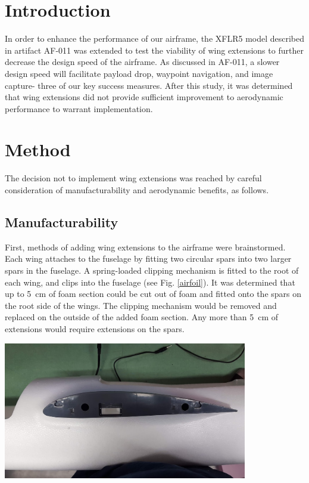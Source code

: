 \documentclass[]{auvsi_doc}
\begin{document}
\begin{AUVSITitlePage}
\begin{artifacttable}
\end{artifacttable}
\end{AUVSITitlePage}

\section{Introduction}
In order to enhance the performance of our airframe, the XFLR5 model described in artifact AF-011 was extended to test the viability of wing extensions to further decrease the design speed of the airframe. As discussed in AF-011, a slower design speed will facilitate payload drop, waypoint navigation, and image capture- three of our key success measures. After this study, it was determined that wing extensions did not provide sufficient improvement to aerodynamic performance to warrant implementation.

\section{Method}
The decision not to implement wing extensions was reached by careful consideration of manufacturability and aerodynamic benefits, as follows.

\subsection{Manufacturability}
First, methods of adding wing extensions to the airframe were brainstormed. Each wing attaches to the fuselage by fitting two circular spars into two larger spars in the fuselage. A spring-loaded clipping mechanism is fitted to the root of each wing, and clips into the fuselage (see Fig. \ref{airfoil}). It was determined that up to 5~cm of foam section could be cut out of foam and fitted onto the spars on the root side of the wings. The clipping mechanism would be removed and replaced on the outside of the added foam section. Any more than 5~cm of extensions would require extensions on the spars. 

\begin{center}
	\includegraphics[width=0.8\textwidth]{./airfoils.png}
	\label{airfoil}
\end{center}
\end{document}
